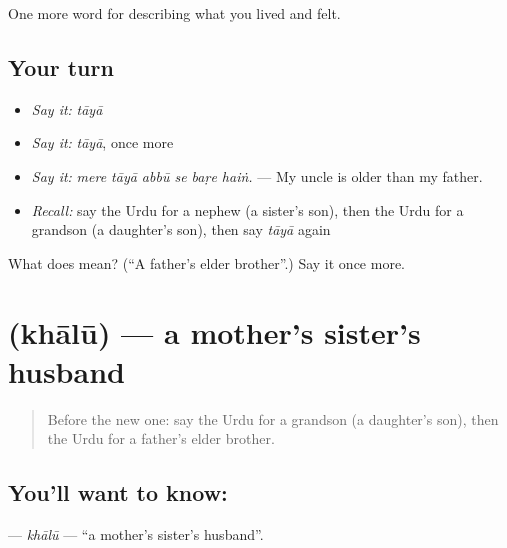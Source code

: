 \begin{grammarlens}[title={What you've built}]
One more word for describing what you lived and felt.
\end{grammarlens}

\subsection*{Your turn}
\begin{itemize}
\raggedright
  \item \emph{Say it:} \emph{tāyā}
  \item \emph{Say it:} \emph{tāyā}, once more
  \item \emph{Say it:} \emph{mere tāyā abbū se baṛe haiṅ.} — My uncle is older than my father.
  \item \emph{Recall:} say the Urdu for a nephew (a sister's son), then the Urdu for a grandson (a daughter's son), then say \emph{tāyā} again
\end{itemize}

\begin{tcolorbox}[breakable,colback=teal!4,colframe=teal!35!black,title={Before you move on}]
What does  mean? (\textquotedblleft{}A father's elder brother\textquotedblright{}.) Say it once more.
\end{tcolorbox}
\section[\texorpdfstring{\ur{خالو} (khālū)}{خالو (khālū)}]{ (khālū) — a mother's sister's husband}

\label{lesson:UR-C490-khalu}



\begin{quote}
Before the new one: say the Urdu for a grandson (a daughter's son), then the Urdu for a father's elder brother.
\end{quote}

\subsection*{You'll want to know: }
\textbf{} — \emph{khālū} — \textquotedblleft{}a mother's sister's husband\textquotedblright{}.

\begin{quote}
     
\end{quote}

